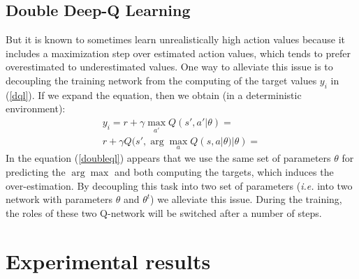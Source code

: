 \documentclass{article}
\begin{document}
\subsection{Double Deep-Q Learning}
But it is known to sometimes learn unrealistically high action values because it includes a maximization step over estimated action values, which tends to prefer overestimated to underestimated values. One way to alleviate this issue is to decoupling the training network from the computing of the target values $y_i$ in (\ref{dql}). If we expand the equation, then we obtain (in a deterministic environment):
\begin{equation}
\label{doubleql}
\begin{aligned}
		y_i =  r + \gamma \max_{a'} Q(s', a'|\theta) = \\
		r + \gamma Q(s', \arg \max_a Q(s, a|\theta)  |\theta) =
\end{aligned}
\end{equation}
In the equation (\ref{doubleql}) appears that we use the same set of parameters $\theta$ for predicting the $\arg \max$ and both computing the targets, which induces the over-estimation. By decoupling this task into two set of parameters (\textit{i.e.} into two network with parameters $\theta$ and $\theta^t $) we alleviate this issue. During the training, the roles of these two Q-network will be switched after a number of steps. 
\section{Experimental results}
\end{document}
